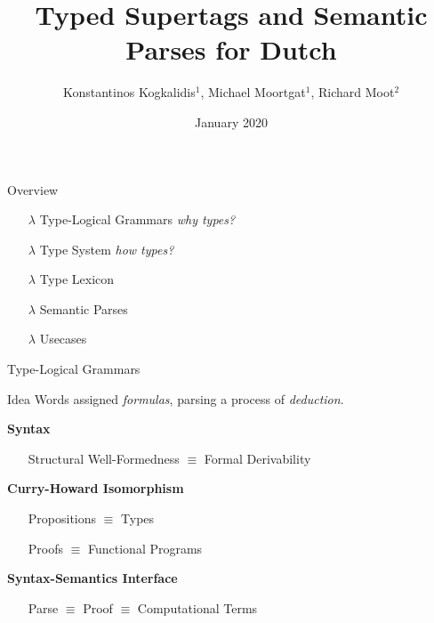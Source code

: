 \documentclass{beamer}
\title{Typed Supertags and Semantic Parses for Dutch}
\institute{${}^1$Utrecht University, ${}^2$Universit{\'e} de Montpellier}
\author{Konstantinos Kogkalidis$^1$, Michael Moortgat$^1$, Richard Moot$^2$}
\date{January 2020}
\begin{document}
\maketitle

\begin{frame}{Overview}
	\begin{itemize}
	\item[$\lambda$] Type-Logical Grammars {\footnotesize\textit{why types?}}
	\item[$\lambda$] Type System {\footnotesize\textit{how types?}}
	\item[$\lambda$] Type Lexicon
	\item[$\lambda$] Semantic Parses
	\item[$\lambda$] Usecases
	\end{itemize}
\end{frame}

\begin{frame}{Type-Logical Grammars}

	\begin{block}{Idea}
		Words assigned \textit{formulas}, 
parsing a process of \textit{deduction}.
	\end{block}
	\vfill
	
 
	
	\textbf{Syntax}
	\begin{itemize}
	\item[] Structural Well-Formedness $\equiv$ Formal Derivability
	\end{itemize}
	\vfill
	
	\textbf{Curry-Howard Isomorphism}
	\begin{itemize}
	\item[] Propositions $\equiv$ Types
	\item[] Proofs $\equiv$ Functional Programs
	\end{itemize}
	\vfill
	
	\textbf{Syntax-Semantics Interface}
	\begin{itemize}
	\item[] Parse $\equiv$ Proof $\equiv$ Computational Terms
	\end{itemize}
\end{frame}
\end{document}
